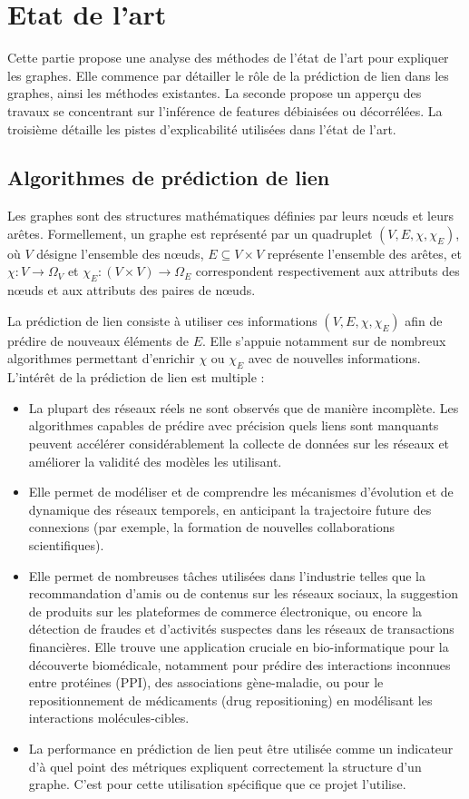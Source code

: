 \section{Etat de l'art}
Cette partie propose une analyse des méthodes de l'état de l'art pour expliquer les graphes. 
Elle commence par détailler le rôle de la prédiction de lien dans les graphes, ainsi les méthodes existantes.
La seconde propose un apperçu des travaux se concentrant sur l'inférence de features débiaisées ou décorrélées. 
La troisième détaille les pistes d'explicabilité utilisées dans l'état de l'art.


\subsection{Algorithmes de prédiction de lien}
Les graphes sont des structures mathématiques définies par leurs nœuds et leurs arêtes. 
Formellement, un graphe est représenté par un quadruplet $(V, E, \chi, \chi_E)$, où $V$ 
désigne l'ensemble des nœuds, $E \subseteq V \times V$ représente l'ensemble des arêtes, 
et $\chi : V \rightarrow \Omega_V$ et $\chi_E : (V \times V) \rightarrow \Omega_E$ correspondent respectivement aux attributs des nœuds et aux attributs des paires de nœuds.

La prédiction de lien consiste à utiliser ces informations $(V, E, \chi, \chi_E)$ afin de prédire de nouveaux éléments de $E$. Elle s'appuie notamment sur de nombreux algorithmes permettant d'enrichir $\chi$ ou $\chi_E$ avec de nouvelles informations. L'intérêt de la prédiction de lien est multiple : 
\begin{itemize}
    \item La plupart des réseaux réels ne sont observés que de manière incomplète. Les algorithmes capables de prédire avec précision quels liens sont manquants peuvent accélérer considérablement la collecte de données sur les réseaux et améliorer la validité des modèles les utilisant.
    \item Elle permet de modéliser et de comprendre les mécanismes d'évolution et de dynamique des réseaux temporels, en anticipant la trajectoire future des connexions (par exemple, la formation de nouvelles collaborations scientifiques).
    \item Elle permet de nombreuses tâches utilisées dans l'industrie telles que la recommandation d'amis ou de contenus sur les réseaux sociaux, la suggestion de produits sur les plateformes de commerce électronique, ou encore la détection de fraudes et d'activités suspectes dans les réseaux de transactions financières. Elle trouve une application cruciale en bio-informatique pour la découverte biomédicale, notamment pour prédire des interactions inconnues entre protéines (PPI), des associations gène-maladie, ou pour le repositionnement de médicaments (drug repositioning) en modélisant les interactions molécules-cibles.
    \item La performance en prédiction de lien peut être utilisée comme un indicateur d'à quel point des métriques expliquent correctement la structure d'un graphe. C'est pour cette utilisation spécifique que ce projet l'utilise.
\end{itemize}

